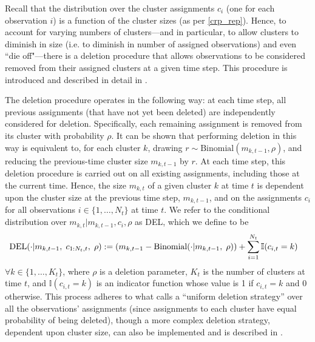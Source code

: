 \documentclass[smallcondensed, final]{svjour3}
\begin{document}
Recall that the distribution over the cluster assignments $c_{i}$ (one for each observation $i$) is a function of the cluster sizes (as per \eqref{crp_rep}). Hence, to account for varying numbers of clusters---and in particular, to allow clusters to diminish in size (i.e. to diminish in number of assigned observations) and even ``die off"---there is a deletion procedure that allows observations to be considered removed from their assigned clusters at a given time step. This procedure is introduced and described in detail in \cite{caron_2007}.

The deletion procedure operates in the following way: at each time step, all previous assignments (that have not yet been deleted) are independently considered for deletion. Specifically, each remaining assignment is removed from its cluster with probability $\rho$.  It can be shown that performing deletion in this way is equivalent to, for each cluster $k$, drawing $r \sim \text{Binomial}(m_{k,t-1}, \rho)$, and reducing the previous-time cluster size $m_{k,t-1}$ by $r$. At each time step, this deletion procedure is carried out on all existing assignments, including those at the current time. Hence, the size $m_{k,t}$ of a given cluster $k$ at time $t$ is dependent upon the cluster size at the previous time step, $m_{k,t-1}$, and on the assignments $c_{i}$ for all observations $i \in \{ 1, \ldots, N_{t} \}$ at time $t$. We refer to the conditional distribution over $m_{k,t} | m_{k,t-1}, c_{i}, \rho$ as DEL, which we define to be
\begin{equation}
\begin{split}
\label{del_step}
\text{DEL} & (\cdot | m_{k,t-1}, \hspace{1mm} c_{1:N_{t}, t}, \hspace{1mm} \rho) :=
\left( m_{k,t-1} - \text{Binomial}( \cdot | {m_{k,t-1}, \hspace{1mm} \rho}) \right) + \sum_{i=1}^{N_{t}} \mathbb{I}(c_{i,t} = k)
\end{split}
\end{equation}
$\forall k \in \{1, \ldots, K_{t} \}$, where $\rho$ is a deletion parameter, $K_{t}$ is the number of clusters at time $t$, and $\mathbb{I}(c_{i,t} = k)$ is an indicator function whose value is 1 if $c_{i,t} = k$ and 0 otherwise. This process adheres to what \cite{caron_2007} calls a ``uniform deletion strategy'' over all the observations' assignments (since assignments to each cluster have equal probability of being deleted), though a more complex deletion strategy, dependent upon cluster size, can also be implemented and is described in \cite{caron_2007}.
\end{document}
